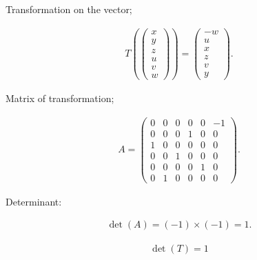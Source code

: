 \documentclass[journal,12pt,onecolumn]{IEEEtran}
\begin{document}
Transformation on the vector;

\begin{align}
T\!\left(
\begin{pmatrix}
x \\ y \\ z \\ u \\ v \\ w
\end{pmatrix}
\right)
=
\begin{pmatrix}
-w \\ u \\ x \\ z \\ v \\ y
\end{pmatrix}.
\end{align}

Matrix of transformation;

\begin{align}
A =
\begin{pmatrix}
0 & 0 & 0 & 0 & 0 & -1 \\
0 & 0 & 0 & 1 & 0 & 0 \\
1 & 0 & 0 & 0 & 0 & 0 \\
0 & 0 & 1 & 0 & 0 & 0 \\
0 & 0 & 0 & 0 & 1 & 0 \\
0 & 1 & 0 & 0 & 0 & 0
\end{pmatrix}.
\end{align}

Determinant:

\begin{align}
\det(A) = (-1)\times(-1) = 1.
\end{align}

\begin{align}
{\det(T) = 1}
\end{align}
\end{document}
